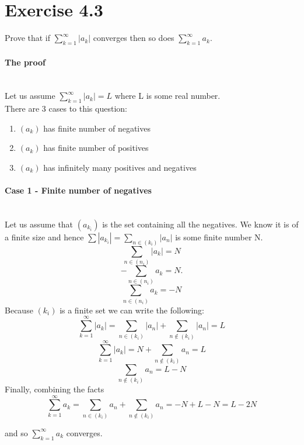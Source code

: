 \documentclass[11pt]{article}
\begin{document}
	\newcommand{\R}{\mathbb{R}}
	\newcommand{\Q}{\mathbb{Q}}
	\newcommand{\Z}{\mathbb{Z}}
	\newcommand{\N}{\mathbb{N}}
	\section*{Exercise 4.3}
	
Prove that if $\sum\limits_{k=1}^{\infty}|a_k|$ converges then so does $\sum\limits_{k=1}^{\infty}a_k$.

\bigskip

\paragraph{The proof} ~\\

Let us assume $\sum\limits_{k=1}^{\infty}|a_k| = L$ where L is some real number. ~\\

There are 3 cases to this question:
\begin{enumerate}
	\item $(a_k)$ has finite number of negatives
	\item $(a_k)$ has finite number of positives
	\item $(a_k)$ has infinitely many positives and negatives
\end{enumerate} 

\paragraph{Case 1 - Finite number of negatives} ~\\

Let us assume that $(a_{k_i})$ is the set containing all the negatives. We know it is of a finite size and hence $\sum |a_{k_i}|=\sum\limits_{n \in (k_i)} |a_n|$ is some finite number N. 
\[
\sum\limits_{n \in (n_i)} |a_k| = N
\]
\[
-\sum\limits_{n \in (n_i)} a_k = N.  
\]
\[
\sum\limits_{n \in (n_i)} a_k = -N    
\]
Because $(k_i)$ is a finite set we can write the following:
\[
\sum\limits_{k=1}^{\infty}|a_k| = \sum\limits_{n \in (k_i)} |a_n| + \sum\limits_{n \notin (k_i)} |a_{n}| = L
\]
\[
\sum\limits_{k=1}^{\infty}|a_k| = N + \sum\limits_{n \notin (k_i)} a_{n} = L
\]
\[
\sum\limits_{n \notin (k_i)} a_{n} = L - N
\]
Finally, combining the facts 
\[
\sum\limits_{k=1}^{\infty}a_k = \sum\limits_{n \in (k_i)} a_n + \sum\limits_{n \notin (k_i)} a_{n} = -N + L - N = L - 2N
\]

and so $\sum\limits_{k=1}^{\infty}a_k$ converges.
\end{document}
